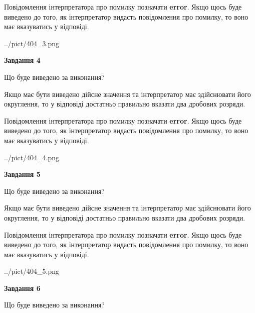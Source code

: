 \documentclass[12pt, ukrainian]{article}
\begin{document}
{\begin {Large}
Повідомлення інтерпретатора про помилку позначати \textbf{error}.
Якщо щось буде виведено до того, як інтерпретатор видасть повідомлення про помилку, 
то воно має вказуватись у відповіді. \par

\begin{center}
	{../pict/404_3.png}
\end{center}
\newpage

{\begin {center}\textbf{Завдання 4}\end {center}}\par
Що буде виведено за виконання? \par

Якщо має бути виведено дійсне значення та інтерпретатор має здійснювати його округлення, 
то у відповіді достатньо правильно вказати два дробових розряди.

Повідомлення інтерпретатора про помилку позначати \textbf{error}.
Якщо щось буде виведено до того, як інтерпретатор видасть повідомлення про помилку, 
то воно має вказуватись у відповіді. \par

\begin{center}
	{../pict/404_4.png}
\end{center}
\newpage

{\begin {center}\textbf{Завдання 5}\end {center}}\par
Що буде виведено за виконання? \par

Якщо має бути виведено дійсне значення та інтерпретатор має здійснювати його округлення, 
то у відповіді достатньо правильно вказати два дробових розряди.

Повідомлення інтерпретатора про помилку позначати \textbf{error}.
Якщо щось буде виведено до того, як інтерпретатор видасть повідомлення про помилку, 
то воно має вказуватись у відповіді. \par

\begin{center}
	{../pict/404_5.png}
\end{center}
\newpage

{\begin {center}\textbf{Завдання 6}\end {center}}\par
Що буде виведено за виконання? \par


\end{Large}}
\end{document}
